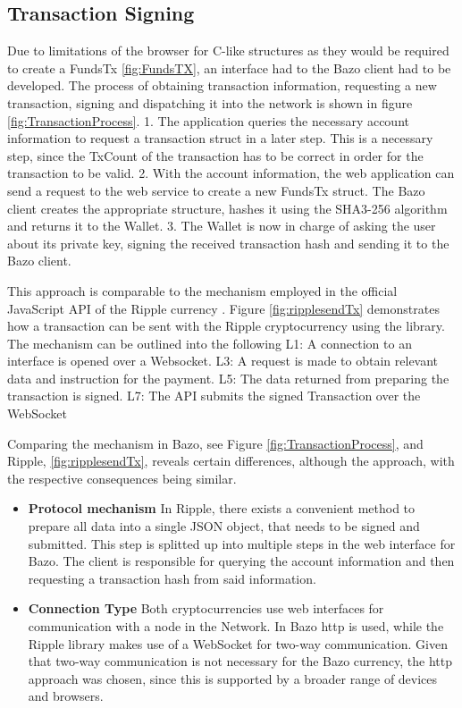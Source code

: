 \subsection{Transaction Signing}\label{transactionsigning}
Due to limitations of the browser for C-like structures as they would be required to create a FundsTx \ref{fig:FundsTX}, an interface had to the Bazo client had to be developed. 
The process of obtaining transaction information, requesting a new transaction, signing and dispatching it into the network is shown in figure \ref{fig:TransactionProcess}.
1. The application queries the necessary account information to request a transaction struct in a later step. This is a necessary step, since the TxCount of the transaction has to be correct in order for the transaction to be valid.
2. With the account information, the web application can send a request to the web service to create a new FundsTx struct. The Bazo client creates the appropriate structure, hashes it using the SHA3-256 algorithm and returns it to the Wallet.
3. The Wallet is now in charge of asking the user about its private key, signing the received transaction hash and sending it to the Bazo client.

This approach is comparable to the mechanism employed in the official JavaScript API of the Ripple currency \cite{ripplelib}.
Figure \ref{fig:ripplesendTx} demonstrates how a transaction can be sent with the Ripple cryptocurrency using the library. The mechanism can be outlined into the following
L1: A connection to an interface is opened over a Websocket. 
L3: A request is made to obtain relevant data and instruction for the payment.
L5: The data returned from preparing the transaction is signed.
L7: The API submits the signed Transaction over the WebSocket

Comparing the mechanism in Bazo, see Figure \ref{fig:TransactionProcess}, and Ripple, \ref{fig:ripplesendTx}, reveals certain differences, although the approach, with the respective consequences being similar.
\begin{itemize}
\item \textbf{Protocol mechanism} In Ripple, there exists a convenient method to prepare all data into a single JSON object, that needs to be signed and submitted. This step is splitted up into multiple steps in the web interface for Bazo. The client is responsible for querying the account information and then requesting a transaction hash from said information.
\item \textbf{Connection Type} Both cryptocurrencies use web interfaces for communication with a node in the Network. In Bazo http is used, while the Ripple library makes use of a WebSocket for two-way communication. Given that two-way communication is not necessary for the Bazo currency, the http approach was chosen, since this is supported by a broader range of devices and browsers.
\end{itemize}

